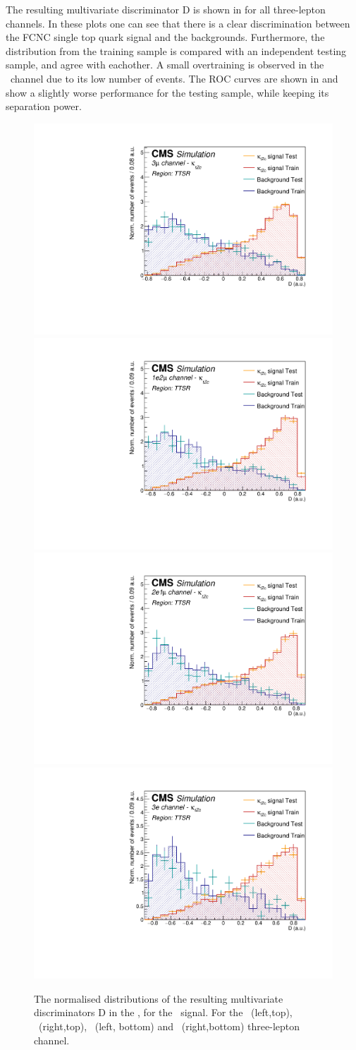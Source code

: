 \clearpage

The resulting multivariate discriminator D is shown in  for all three-lepton channels. In these plots one can see that there is a clear discrimination between the FCNC single top quark signal and the backgrounds. Furthermore, the distribution from the training sample is compared with an independent testing sample, and  agree with eachother. A small overtraining is observed in the \eee\ channel due to its low number of events. The ROC curves are shown in  and show a slightly worse performance for the testing sample, while keeping its separation power. 
\begin{figure}[htbp]
	\centering
	\includegraphics[width=0.49\linewidth]{6_Search/Figures/PlotsTechnics/SigVsBkgTestZcttoppairuuu}
	\includegraphics[width=0.49\linewidth]{6_Search/Figures/PlotsTechnics/SigVsBkgTestZcttoppairuue}
	\includegraphics[width=0.49\linewidth]{6_Search/Figures/PlotsTechnics/SigVsBkgTestZcttoppaireeu}
	\includegraphics[width=0.49\linewidth]{6_Search/Figures/PlotsTechnics/SigVsBkgTestZcttoppaireee}
	\caption{The normalised distributions of the resulting  multivariate discriminators D in the \TTSR, for the \Zct\ signal. For the \mumumu\ (left,top), \emumu\ (right,top), \eemu\ (left, bottom) and \eee\ (right,bottom) three-lepton channel.}
	\label{fig:sigvsbkgtestzcttoppaire}
\end{figure}

